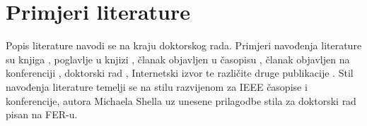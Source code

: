\begin{landscape}
\begin{table}
\begin{minipage}{\linewidth}
\begin{tabularx} {\linewidth}{l C C C C C C C C C C C C}
      \end{tabularx} 
      \label{tab:mean_mias}
      \setcounter{footnote}{\value{mpfootnote}}
    \end{minipage}
  \end{table}
\end{landscape}


\section{Primjeri literature}

Popis literature navodi se na kraju doktorskog rada. Primjeri navođenja
literature su knjiga \cite{Hajn01}, poglavlje u knjizi \cite{Samp05}, članak
objavljen u časopisu \cite{Sim03}, članak objavljen na konferenciji
\cite{Wirt99}, doktorski rad \cite{Will93}, Internetski izvor \cite{Jone12} te
različite druge publikacije \cite{Rsoft}. Stil navođenja literature temelji se
na stilu razvijenom za IEEE časopise i konferencije, autora Michaela Shella uz
unesene prilagodbe stila za doktorski rad pisan na FER-u.
